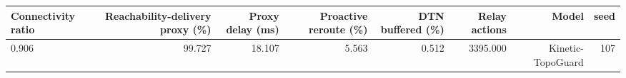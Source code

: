 \begin{tabular}{lrrrrrrr}
\toprule
Connectivity ratio & Reachability-delivery proxy (\%) & Proxy delay (ms) & Proactive reroute (\%) & DTN buffered (\%) & Relay actions & Model & seed \\
\midrule
0.906 & 99.727 & 18.107 & 5.563 & 0.512 & 3395.000 & Kinetic-TopoGuard & 107 \\
\bottomrule
\end{tabular}